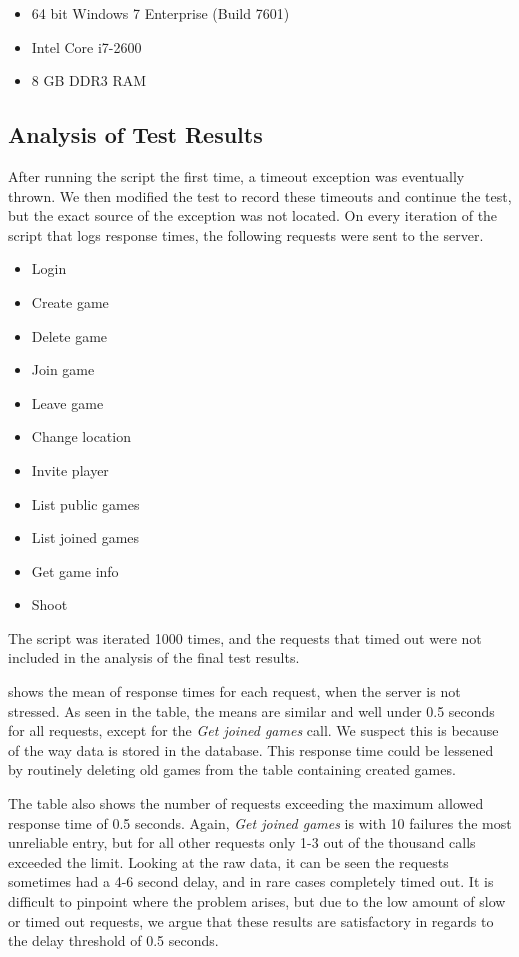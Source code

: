 \begin{itemize}
\item 64 bit Windows 7 Enterprise (Build 7601)
\item Intel Core i7-2600
\item 8 GB DDR3 RAM
\end{itemize}

\subsection{Analysis of Test Results}
After running the script the first time, a timeout exception was eventually thrown. We then modified the test to record these timeouts and continue the test, but the exact source of the exception was not located. On every iteration of the script that logs response times, the following requests were sent to the server.

\begin{itemize}
\item Login
\item Create game
\item Delete game
\item Join game
\item Leave game
\item Change location
\item Invite player
\item List public games
\item List joined games
\item Get game info
\item Shoot
\end{itemize}

The script was iterated 1000 times, and the requests that timed out were not included in the analysis of the final test results.

 shows the mean of response times for each request, when the server is not stressed. As seen in the table, the means are similar and well under 0.5 seconds for all requests, except for the \textit{Get joined games} call. We suspect this is because of the way data is stored in the database. This response time could be lessened by routinely deleting old games from the table containing created games.

The table also shows the number of requests exceeding the maximum allowed response time of 0.5 seconds. Again, \textit{Get joined games} is with 10 failures the most unreliable entry, but for all other requests only 1-3 out of the thousand calls exceeded the limit. Looking at the raw data, it can be seen the requests sometimes had a 4-6 second delay, and in rare cases completely timed out. It is difficult to pinpoint where the problem arises, but due to the low amount of slow or timed out requests, we argue that these results are satisfactory in regards to the delay threshold of 0.5 seconds.

